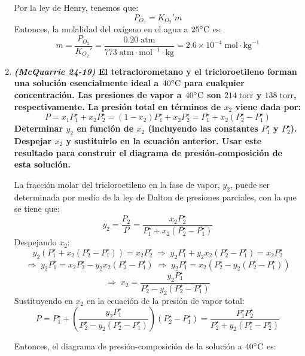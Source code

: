 \documentclass[a4paper,12pt]{article}
\begin{document}
\begin{enumerate}
Por la ley de Henry, tenemos que:
$$P_{O_2}=K_{O_2}'m$$
Entonces, la molalidad del ox\'igeno en el agua a $25\celsius$ es:
$$m=\frac{P_{O_2}}{K_{O_2}'}=\frac{0.20\;\mbox{atm}}{773\;\mbox{atm}\cdot\mbox{mol}^{-1}\cdot\mbox{kg}}=2.6\times 10^{-4}\;\mbox{mol}\cdot\mbox{kg}^{-1}$$


 \item \textbf{\textit{(McQuarrie 24-19)} El tetraclorometano y el tricloroetileno forman una solución esencialmente ideal a $40\celsius$ para cualquier concentración. Las presiones de vapor a $40\celsius$ son $214\;\mbox{torr}$ y $138\;\mbox{torr}$, respectivamente. La presi\'on total en t\'erminos de $x_2$ viene dada por:
$$P=x_1P_1^\star+x_2P_2^\star=(1-x_2)P_1^\star+x_2P_2^\star=P_1^\star+x_2(P_2^\star-P_1^\star)$$
Determinar $y_2$ en funci\'on de $x_2$ (incluyendo las constantes $P_1^\star$ y $P_2^\star$). Despejar $x_2$ y sustituirlo en la ecuaci\'on anterior. Usar este resultado para construir el diagrama de presi\'on-composici\'on de esta soluci\'on.} %

La fracci\'on molar del tricloroetileno en la fase de vapor, $y_2$, puede ser determinada por medio de la ley de Dalton de presiones parciales, con la que se tiene que:
$$y_2=\frac{P_2}{P}=\frac{x_2P_2^\star}{P_1^\star+x_2(P_2^\star-P_1^\star)}$$
Despejando $x_2$:
$$y_2(P_1^\star+x_2(P_2^\star-P_1^\star))=x_2P_2^\star\;\Rightarrow\;y_2P_1^\star+y_2x_2(P_2^\star-P_1^\star)=x_2P_2^\star$$
$$\Rightarrow\;y_2P_1^\star=x_2P_2^\star-y_2x_2(P_2^\star-P_1^\star)\;\Rightarrow\;y_2P_1^\star=x_2(P_2^\star-y_2(P_2^\star-P_1^\star))$$
$$\Rightarrow\;x_2=\frac{y_2P_1^\star}{P_2^\star-y_2(P_2^\star-P_1^\star)}$$
Sustituyendo en $x_2$ en la ecuaci\'on de la presi\'on de vapor total:
$$P=P_1^\star+\left(\frac{y_2P_1^\star}{P_2^\star-y_2(P_2^\star-P_1^\star)}\right)(P_2^\star-P_1^\star)=\frac{P_1^\star P_2^\star}{P_2^\star+y_2(P_1^\star-P_2^\star)}$$

Entonces, el diagrama de presi\'on-composici\'on de la soluci\'on a $40\celsius$ es:


\end{enumerate}
\end{document}
